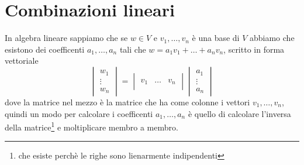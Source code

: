 \documentclass[11pt,a4paper]{report}
\theoremstyle{definition}
\theoremstyle{plain}
\theoremstyle{plain}
\begin{document}
		\section{Combinazioni lineari}
			In algebra lineare sappiamo che se $w\in V$ e ${v_1,\dots,v_n}$ è una base di $V$ abbiamo che esistono dei coefficenti $a_1,\dots,a_n$ tali che $w=a_1 v_1+\dots +a_n v_n$, scritto in forma vettoriale
			\begin{equation}
				\begin{vmatrix}
					w_1\\
					\vdots\\
					w_n
				\end{vmatrix}
				=
				\begin{vmatrix}
					& & \\
					v_1 & \dots & v_n\\
					& & 
				\end{vmatrix}
				\begin{vmatrix}
					a_1\\
					\vdots\\
					a_n
				\end{vmatrix}
			\end{equation}
			dove la matrice nel mezzo è la matrice che ha come colonne i vettori $v_1,\dots,v_n$, quindi un modo per calcolare i coefficenti $a_1,\dots,a_n$ è quello di calcolare l'inversa della matrice\footnote{che esiste perchè le righe sono lienarmente indipendenti} e moltiplicare membro a membro.\newline
\end{document}
